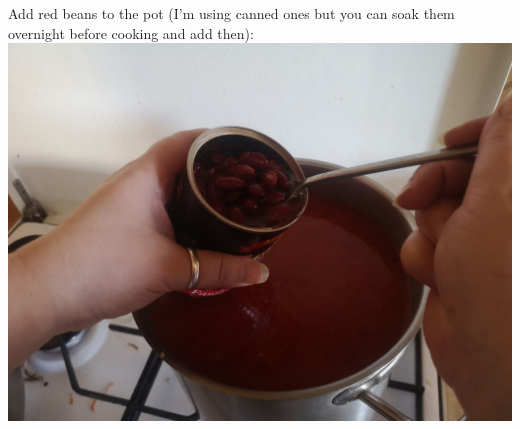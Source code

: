 \documentclass[11pt,a4paper]{article}
\begin{document}
Add red beans to the pot (I'm using canned ones but you can soak them overnight before cooking and add then): \\
\includegraphics[width=\textwidth]{14.jpg} \\
\end{document}
